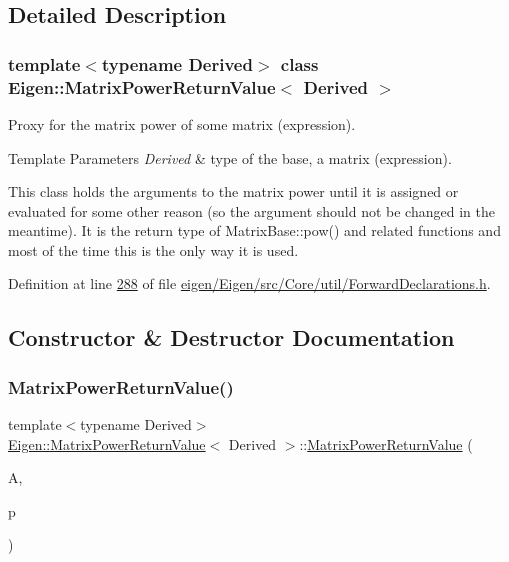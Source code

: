 \subsection{Detailed Description}
\subsubsection*{template$<$typename Derived$>$\newline
class Eigen\+::\+Matrix\+Power\+Return\+Value$<$ Derived $>$}

Proxy for the matrix power of some matrix (expression). 


\begin{DoxyTemplParams}{Template Parameters}
{\em Derived} & type of the base, a matrix (expression).\\
\hline
\end{DoxyTemplParams}
This class holds the arguments to the matrix power until it is assigned or evaluated for some other reason (so the argument should not be changed in the meantime). It is the return type of Matrix\+Base\+::pow() and related functions and most of the time this is the only way it is used. 

Definition at line \hyperlink{eigen_2_eigen_2src_2_core_2util_2_forward_declarations_8h_source_l00288}{288} of file \hyperlink{eigen_2_eigen_2src_2_core_2util_2_forward_declarations_8h_source}{eigen/\+Eigen/src/\+Core/util/\+Forward\+Declarations.\+h}.



\subsection{Constructor \& Destructor Documentation}
\mbox{\label{class_eigen_1_1_matrix_power_return_value_a3067e09b352f967a23bb2a9c50afee88}} 
\subsubsection{\texorpdfstring{Matrix\+Power\+Return\+Value()}{MatrixPowerReturnValue()}\hspace{0.1cm}{\footnotesize\ttfamily [1/2]}}
{\footnotesize\ttfamily template$<$typename Derived$>$ \\
\hyperlink{class_eigen_1_1_matrix_power_return_value}{Eigen\+::\+Matrix\+Power\+Return\+Value}$<$ Derived $>$\+::\hyperlink{class_eigen_1_1_matrix_power_return_value}{Matrix\+Power\+Return\+Value} (\begin{DoxyParamCaption}\item[{const Derived \&}]{A,  }\item[{Real\+Scalar}]{p }\end{DoxyParamCaption})\hspace{0.3cm}{\ttfamily [inline]}}



